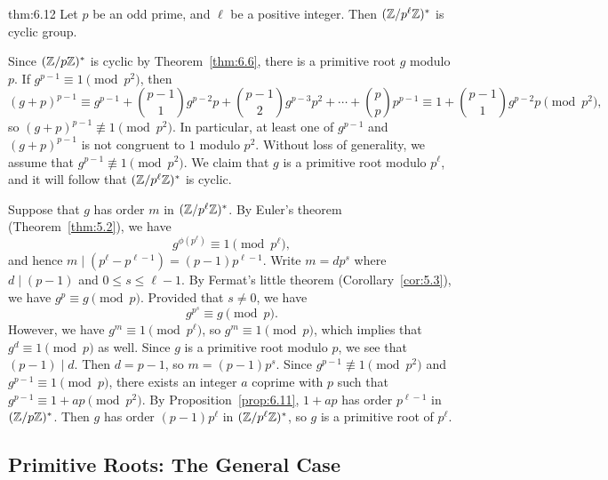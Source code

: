 \begin{theo}{thm:6.12}
    Let $p$ be an odd prime, and $\ell$ be a positive integer. Then 
    $(\mathbb{Z}/p^\ell\mathbb{Z})^*$ is cyclic group. 
\end{theo}
\begin{pf}
    Since $(\mathbb{Z}/p\mathbb{Z})^*$ is cyclic by Theorem~\ref{thm:6.6}, there is a primitive 
    root $g$ modulo $p$. If $g^{p-1} \equiv 1 \pmod{p^2}$, then 
    \[ (g+p)^{p-1} \equiv g^{p-1} + \binom{p-1}{1} g^{p-2}p + \binom{p-1}{2} 
    g^{p-3}p^2 + \cdots + \binom{p}{p} p^{p-1} \equiv 1 + \binom{p-1}{1} 
    g^{p-2}p \pmod{p^2}, \] 
    so $(g+p)^{p-1} \not\equiv 1 \pmod{p^2}$. In particular, at least one of 
    $g^{p-1}$ and $(g+p)^{p-1}$ is not congruent to $1$ modulo $p^2$. 
    Without loss of generality, we assume that $g^{p-1} \not\equiv 1 \pmod{p^2}$. 
    We claim that $g$ is a primitive root modulo $p^\ell$, and it will follow that 
    $(\mathbb{Z}/p^\ell\mathbb{Z})^*$ is cyclic. 

    Suppose that $g$ has order $m$ in $(\mathbb{Z}/p^\ell\mathbb{Z})^*$. By Euler's theorem 
    (Theorem~\ref{thm:5.2}), we have 
    \[ g^{\phi(p^\ell)} \equiv 1 \pmod{p^\ell}, \] 
    and hence $m \mid (p^\ell - p^{\ell-1}) = (p-1)p^{\ell-1}$. Write 
    $m = dp^s$ where $d \mid (p-1)$ and $0 \leq s \leq \ell-1$. By Fermat's 
    little theorem (Corollary~\ref{cor:5.3}), we have $g^p \equiv g \pmod p$. 
    Provided that $s \neq 0$, we have 
    \[ g^{p^s} \equiv g \pmod p. \] 
    However, we have $g^m \equiv 1 \pmod{p^\ell}$, so $g^m \equiv 1 \pmod p$, 
    which implies that $g^d \equiv 1 \pmod p$ as well. Since $g$ is a 
    primitive root modulo $p$, we see that $(p-1) \mid d$. Then $d = p-1$,
    so $m = (p-1)p^s$. Since $g^{p-1} \not\equiv 1 \pmod{p^2}$ and 
    $g^{p-1} \equiv 1 \pmod p$, there exists an integer $a$ coprime with $p$ 
    such that $g^{p-1} \equiv 1 + ap \pmod{p^2}$. By Proposition~\ref{prop:6.11}, 
    $1 + ap$ has order $p^{\ell-1}$ in $(\mathbb{Z}/p\mathbb{Z})^*$. Then $g$ has order 
    $(p-1)p^\ell$ in $(\mathbb{Z}/p^\ell\mathbb{Z})^*$, so $g$ is a primitive root of $p^\ell$. 
\end{pf}

\subsection{Primitive Roots: The General Case}

